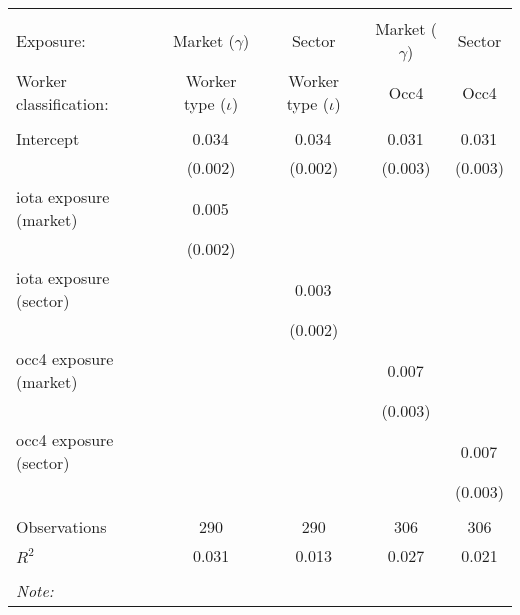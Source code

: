 \begin{tabular}{@{\extracolsep{5pt}}lcccc}
\\[-1.8ex]\hline
\hline \\[-1.8ex]
\hline \\[-1.8ex]
 Exposure: & Market ($\gamma$) & Sector & Market ($\gamma$) & Sector \\
 Worker classification: & Worker type ($\iota$) & Worker type ($\iota$) & Occ4 & Occ4 \\
 \hline &  &  &  &  \\
 Intercept & 0.034$^{}$ & 0.034$^{}$ & 0.031$^{}$ & 0.031$^{}$ \\
  & (0.002) & (0.002) & (0.003) & (0.003) \\
 iota exposure (market) & 0.005$^{}$ & & & \\
  & (0.002) & & & \\
 iota exposure (sector) & & 0.003$^{}$ & & \\
  & & (0.002) & & \\
 occ4 exposure (market) & & & 0.007$^{}$ & \\
  & & & (0.003) & \\
 occ4 exposure (sector) & & & & 0.007$^{}$ \\
  & & & & (0.003) \\
\hline \\[-1.8ex]
 Observations & 290 & 290 & 306 & 306 \\
 $R^2$ & 0.031 & 0.013 & 0.027 & 0.021 \\
\hline
\hline \\[-1.8ex]
\textit{Note:}\end{tabular}